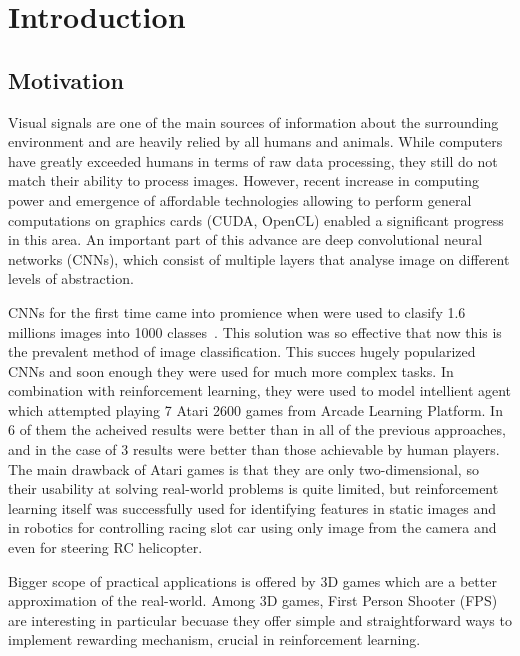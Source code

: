 
\chapter{Introduction}
\label{ch:introduction}
\section{Motivation}


Visual signals are one of the main sources of information about the surrounding environment and are heavily relied by all humans and animals.
While computers have greatly exceeded humans in terms of raw data processing, they still do not match their ability to process images.
However, recent increase in computing power and emergence of affordable technologies allowing to perform general computations on graphics cards (CUDA, OpenCL) enabled a significant progress in this area.
An important part of this advance are deep convolutional neural networks (CNNs), which consist of multiple layers that analyse image on different levels of abstraction.


CNNs for the first time came into promience when were used to clasify 1.6 millions images into 1000 classes~\cite{NIPS2012_4824}.
This solution was so effective that now this is the prevalent method of image classification.
This succes hugely popularized CNNs and soon enough they were used for much more complex tasks.
In combination with reinforcement learning, they were used to model intellient agent which attempted playing 7 Atari 2600 games from Arcade Learning Platform\cite{mnih-atari-2013}.
In 6 of them the acheived results were better than in all of the previous approaches, and in the case of 3 results were better than those achievable by human players.
The main drawback of Atari games is that they are only two-dimensional, so their usability at solving real-world problems is quite limited, but reinforcement learning itself was successfully used for identifying features in static images \cite{conf/cvpr/GoodrichA12} and in robotics for controlling racing slot car using only image from the camera \cite{rieijcnn12} and even for steering RC helicopter\cite{Abbeel07anapplication}.

Bigger scope of practical applications is offered by 3D games which are a better approximation of the real-world.
Among 3D games, First Person Shooter (FPS) are interesting in particular becuase they offer simple and straightforward ways to implement rewarding mechanism, crucial in reinforcement learning.


